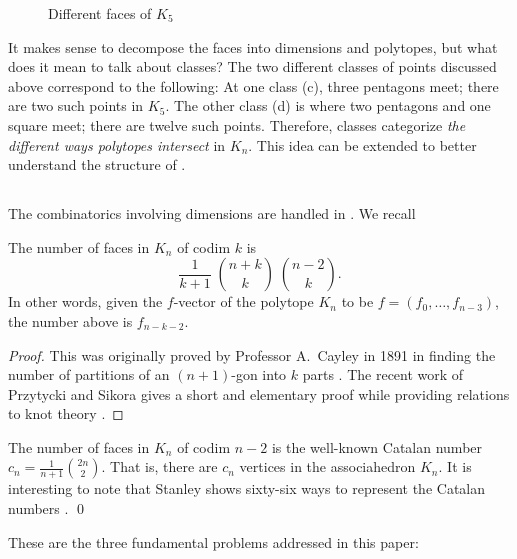 \documentclass[10pt]{amsart}
\begin{document}
\begin{figure} [h]
\caption{Different faces of $K_5$}
\label{types}
\end{figure}

It makes sense to decompose the faces into dimensions and polytopes, but what does it mean to talk about classes?  The two different classes of points discussed above correspond to the following:  At one class (c), three pentagons meet; there are two such points in $K_5$.  The other class (d) is where two pentagons and one square meet; there are twelve such points.  Therefore, classes categorize {\em the different ways polytopes intersect} in $K_n$. This idea can be extended to better understand the structure of .


\subsection{}
The combinatorics involving dimensions are handled in \cite{dev}.  We recall

\begin{lem}
The number of faces in $K_n$ of codim $k$ is $$\frac{1}{k+1} \; \binom{n+k}{k} \; \binom{n-2}{k}.$$ 
In other words, given the $f$-vector of the polytope $K_n$ to be $f=(f_0, \ldots, f_{n-3})$, the number above is $f_{n-k-2}$.
\label{l:cayley}
\end{lem}

\begin{proof}
This was originally proved by Professor A.\ Cayley in 1891 in finding the number of partitions of an $(n+1)$-gon into $k$ parts  \cite{cay}. The recent work of Przytycki and Sikora gives a short and elementary proof while providing relations to knot theory \cite{ps}. 
\end{proof}

\begin{rem}
The number of faces in $K_n$ of codim $n-2$ is the well-known Catalan number $c_n = \frac{1}{n+1} \binom{2n}{2}$.  That is, there are $c_n$ vertices in the associahedron $K_n$.  It is interesting to note that Stanley shows sixty-six ways to represent the Catalan numbers \cite[Exercise 6.19]{s2}.
\qed
\end{rem}

\noindent These are the three fundamental problems addressed in this paper:
\vspace{.1in}
\end{document}
